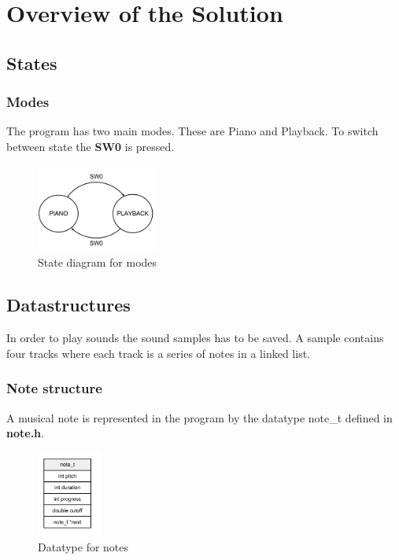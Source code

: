 \section{Overview of the Solution}

\subsection{States}

\subsubsection{Modes}

The program has two main modes. These are Piano and Playback. To switch between state the \textbf{SW0} is
pressed.

\begin{figure}[h]
  \centerline{\includegraphics[width=150px]{mode.png}}
  \caption{State diagram for modes}
\end{figure}

\subsection{Datastructures}

In order to play sounds the sound samples has to be saved. A sample contains four tracks where each track
is a series of notes in a linked list.

\subsubsection{Note structure}
A musical note is represented in the program by the datatype note\_t defined in \textbf{note.h}.
\begin{figure}[h]
  \centerline{\includegraphics[width=80px]{note_t.png}}
  \caption{Datatype for notes}
\end{figure}

